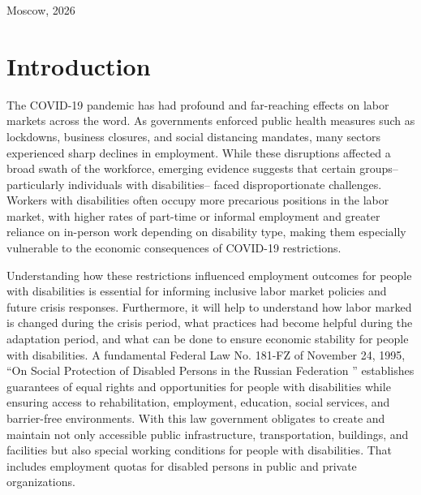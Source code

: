 \documentclass[14pt,a4paper, screen]{scrbook}
\begin{document}
		
		\vfill
		
		\begin{center}
			\normalsize Moscow, 2026
		\end{center}
		
		\endgroup
		
		
		\tableofcontents  %
		
		\chapter*{Introduction}
		The COVID-19 pandemic has had profound and far-reaching effects on labor markets across the word. As governments enforced public health measures such as lockdowns, business closures, and social distancing mandates, many sectors experienced sharp declines in employment. While these disruptions affected a broad swath of the workforce, emerging evidence suggests that certain groups– particularly individuals with disabilities– faced disproportionate challenges. Workers with disabilities often occupy more precarious positions in the labor market, with higher rates of part-time or informal employment and greater reliance on in-person work depending on disability type, making them especially vulnerable to the economic consequences of COVID-19 restrictions.
		
		Understanding how these restrictions influenced employment outcomes for people with disabilities is essential for informing inclusive labor market policies and future crisis responses. Furthermore, it will help to understand how labor marked is changed during the crisis period, what practices had become helpful during the adaptation period, and what can be done to ensure economic stability for people with disabilities. A fundamental Federal Law No. 181-FZ of November 24, 1995, “On Social Protection of Disabled Persons in the Russian Federation ”  establishes guarantees of equal rights and opportunities for people with disabilities while ensuring access to rehabilitation, employment, education, social services, and barrier-free environments. With this law government obligates to create and maintain not only accessible public infrastructure, transportation, buildings, and facilities but also special working conditions for people with disabilities. That includes employment quotas for disabled persons in public and private organizations. 
		
\end{document}
